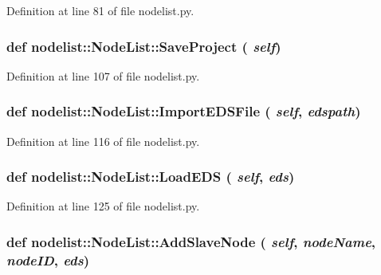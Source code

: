 Definition at line 81 of file nodelist.py.\hypertarget{classnodelist_1_1NodeList_b90b33e930a1d08ad4bb81f912c30a68}{
\subsubsection[SaveProject]{\setlength{\rightskip}{0pt plus 5cm}def nodelist::Node\-List::Save\-Project ( {\em self})}}
\label{classnodelist_1_1NodeList_b90b33e930a1d08ad4bb81f912c30a68}




Definition at line 107 of file nodelist.py.\hypertarget{classnodelist_1_1NodeList_2bf9abf09b0dd06a8801b9e23f6387cb}{
\subsubsection[ImportEDSFile]{\setlength{\rightskip}{0pt plus 5cm}def nodelist::Node\-List::Import\-EDSFile ( {\em self},  {\em edspath})}}
\label{classnodelist_1_1NodeList_2bf9abf09b0dd06a8801b9e23f6387cb}




Definition at line 116 of file nodelist.py.\hypertarget{classnodelist_1_1NodeList_88cdff50bbef6974b09880f5dd772a26}{
\subsubsection[LoadEDS]{\setlength{\rightskip}{0pt plus 5cm}def nodelist::Node\-List::Load\-EDS ( {\em self},  {\em eds})}}
\label{classnodelist_1_1NodeList_88cdff50bbef6974b09880f5dd772a26}




Definition at line 125 of file nodelist.py.\hypertarget{classnodelist_1_1NodeList_4eec8b1c1d88c4806f470f8afcc53e10}{
\subsubsection[AddSlaveNode]{\setlength{\rightskip}{0pt plus 5cm}def nodelist::Node\-List::Add\-Slave\-Node ( {\em self},  {\em node\-Name},  {\em node\-ID},  {\em eds})}}
\label{classnodelist_1_1NodeList_4eec8b1c1d88c4806f470f8afcc53e10}




